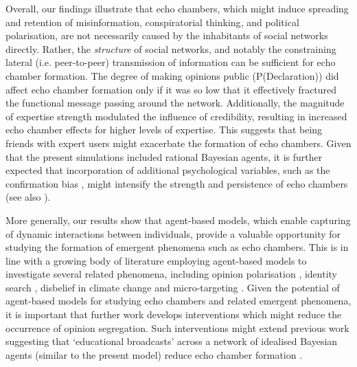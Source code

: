 \documentclass[fleqn,10pt]{wlscirep}
\begin{document}
Overall, our findings illustrate that echo chambers, which might induce spreading and retention of misinformation\cite{vosoughi2018spread}, conspiratorial thinking\cite{del2016spreading}, and political polarisation\cite{bessi2016users, del2016echo}, are not necessarily caused by the inhabitants of social networks directly. Rather, the \textit{structure} of social networks, and notably the constraining lateral (i.e. peer-to-peer) transmission of information can be sufficient for echo chamber formation. The degree of making opinions public (P(Declaration)) did affect echo chamber formation only if it was so low that it effectively fractured the functional message passing around the network. Additionally, the magnitude of expertise strength modulated the influence of credibility, resulting in increased echo chamber effects for higher levels of expertise. This suggests that being friends with expert users might exacerbate the formation of echo chambers. Given that the present simulations included rational Bayesian agents, it is further expected that incorporation of additional psychological variables, such as the confirmation bias \cite{del2016spreading, ngampruetikorn2016bias, starnini2016emergence}, might intensify the strength and persistence of echo chambers (see also \cite{pilditch2017opinion}).

More generally, our results show that agent-based models, which enable capturing of dynamic interactions between individuals, provide a valuable opportunity for studying the formation of emergent phenomena such as echo chambers. This is in line with a growing body of literature employing agent-based models to investigate several related phenomena, including opinion polarisation \cite{duggins2017}, identity search \cite{watts2002identity}, disbelief in climate change \cite{lewandowsky2019influence} and micro-targeting \cite{madsen2018method}. Given the potential of agent-based models for studying echo chambers and related emergent phenomena, it is important that further work develops interventions which might reduce the occurrence of opinion segregation. Such interventions might extend previous work suggesting that `educational broadcasts' across a network of idealised Bayesian agents (similar to the present model) reduce echo chamber formation \cite{madsen2018large}.
\end{document}
